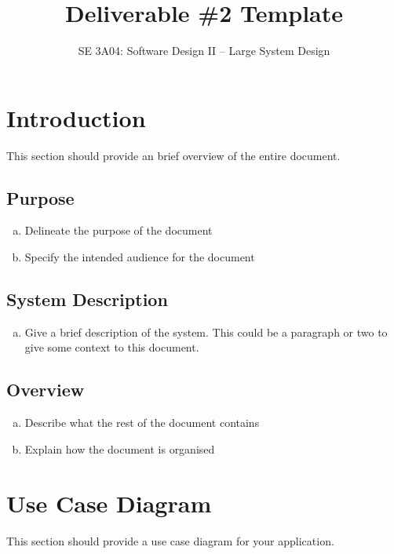 \documentclass[]{article}
\title{Deliverable \#2 Template}
\author{SE 3A04: Software Design II -- Large System Design}
\date{}
\begin{document}
\maketitle	

\section{Introduction}
\label{sec:introduction}

This section should provide an brief overview of the entire document.

\subsection{Purpose}
\label{sub:purpose}
\begin{enumerate}[a)]
	\item Delineate the purpose of the document
	\item Specify the intended audience for the document
\end{enumerate}

\subsection{System Description}
\label{sub:system_description}
\begin{enumerate}[a)]
	\item Give a brief description of the system. This could be a paragraph or two to give some context to this document.
\end{enumerate}

\subsection{Overview}
\label{sub:overview}
\begin{enumerate}[a)]
	\item Describe what the rest of the document contains 
	\item Explain how the document is organised
\end{enumerate}


\section{Use Case Diagram}
\label{sec:use_case_diagram}
This section should provide a use case diagram for your application. 
\end{document}
